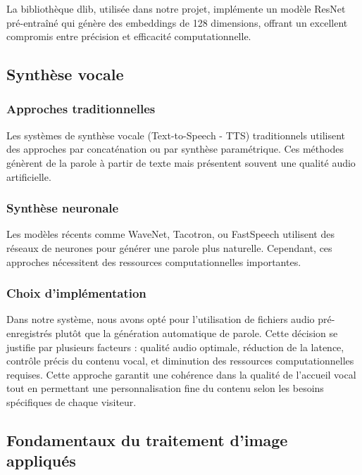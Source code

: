 \documentclass[12pt,a4paper]{article}
\begin{document}
La bibliothèque dlib, utilisée dans notre projet, implémente un modèle ResNet pré-entraîné qui génère des embeddings de 128 dimensions, offrant un excellent compromis entre précision et efficacité computationnelle.

\subsection{Synthèse vocale}

\subsubsection{Approches traditionnelles}

Les systèmes de synthèse vocale (Text-to-Speech - TTS) traditionnels utilisent des approches par concaténation ou par synthèse paramétrique. Ces méthodes génèrent de la parole à partir de texte mais présentent souvent une qualité audio artificielle.

\subsubsection{Synthèse neuronale}

Les modèles récents comme WaveNet, Tacotron, ou FastSpeech utilisent des réseaux de neurones pour générer une parole plus naturelle. Cependant, ces approches nécessitent des ressources computationnelles importantes.

\subsubsection{Choix d'implémentation}

Dans notre système, nous avons opté pour l'utilisation de fichiers audio pré-enregistrés plutôt que la génération automatique de parole. Cette décision se justifie par plusieurs facteurs : qualité audio optimale, réduction de la latence, contrôle précis du contenu vocal, et diminution des ressources computationnelles requises. Cette approche garantit une cohérence dans la qualité de l'accueil vocal tout en permettant une personnalisation fine du contenu selon les besoins spécifiques de chaque visiteur.

\subsection{Fondamentaux du traitement d'image appliqués}
\label{sec:traitement-image}
\end{document}
